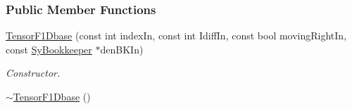 \subsubsection*{Public Member Functions}
\begin{DoxyCompactItemize}
\item 
\hyperlink{classCheMPS2_1_1TensorF1Dbase_a47f965d099706fd38c82ed571cdf03c6}{Tensor\-F1\-Dbase} (const int index\-In, const int Idiff\-In, const bool moving\-Right\-In, const \hyperlink{classCheMPS2_1_1SyBookkeeper}{Sy\-Bookkeeper} $\ast$den\-B\-K\-In)
\begin{DoxyCompactList}\small\item\em Constructor. \end{DoxyCompactList}\item 
\hypertarget{classCheMPS2_1_1TensorF1Dbase_a918d22d256f3427711529d51ea3da30e}{\hyperlink{classCheMPS2_1_1TensorF1Dbase_a918d22d256f3427711529d51ea3da30e}{$\sim$\-Tensor\-F1\-Dbase} ()}\label{classCheMPS2_1_1TensorF1Dbase_a918d22d256f3427711529d51ea3da30e}


\end{DoxyCompactItemize}
